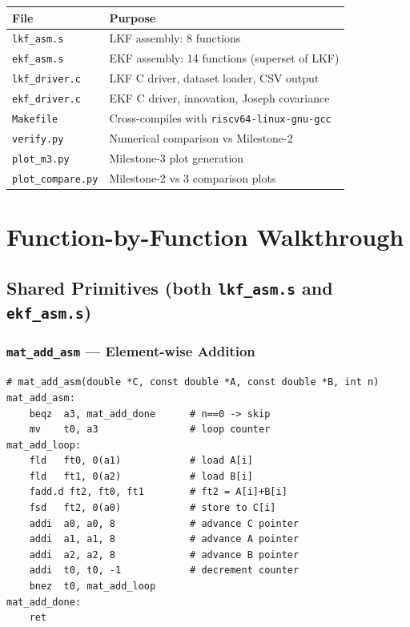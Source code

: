 \documentclass[12pt,a4paper]{article}
\newcommand{\func}[1]{\texttt{\bfseries #1}}
\begin{document}
\begin{tabularx}{\textwidth}{lX}
\toprule
\textbf{File} & \textbf{Purpose} \\
\midrule
\texttt{lkf\_asm.s}    & LKF assembly: 8 functions \\
\texttt{ekf\_asm.s}    & EKF assembly: 14 functions (superset of LKF) \\
\texttt{lkf\_driver.c} & LKF C driver, dataset loader, CSV output \\
\texttt{ekf\_driver.c} & EKF C driver, innovation, Joseph covariance \\
\texttt{Makefile}      & Cross-compiles with \texttt{riscv64-linux-gnu-gcc} \\
\texttt{verify.py}     & Numerical comparison vs Milestone-2 \\
\texttt{plot\_m3.py}   & Milestone-3 plot generation \\
\texttt{plot\_compare.py} & Milestone-2 vs 3 comparison plots \\
\bottomrule
\end{tabularx}

\section{Function-by-Function Walkthrough}
\label{sec:functions}

\subsection{Shared Primitives (both \texttt{lkf\_asm.s} and \texttt{ekf\_asm.s})}

\subsubsection{\func{mat\_add\_asm} --- Element-wise Addition}

\begin{lstlisting}[caption={\func{mat\_add\_asm}: C[i] = A[i] + B[i] for n elements},label=lst:matadd]
# mat_add_asm(double *C, const double *A, const double *B, int n)
mat_add_asm:
    beqz  a3, mat_add_done      # n==0 -> skip
    mv    t0, a3                # loop counter
mat_add_loop:
    fld   ft0, 0(a1)            # load A[i]
    fld   ft1, 0(a2)            # load B[i]
    fadd.d ft2, ft0, ft1        # ft2 = A[i]+B[i]
    fsd   ft2, 0(a0)            # store to C[i]
    addi  a0, a0, 8             # advance C pointer
    addi  a1, a1, 8             # advance A pointer
    addi  a2, a2, 8             # advance B pointer
    addi  t0, t0, -1            # decrement counter
    bnez  t0, mat_add_loop
mat_add_done:
    ret
\end{lstlisting}
\end{document}
